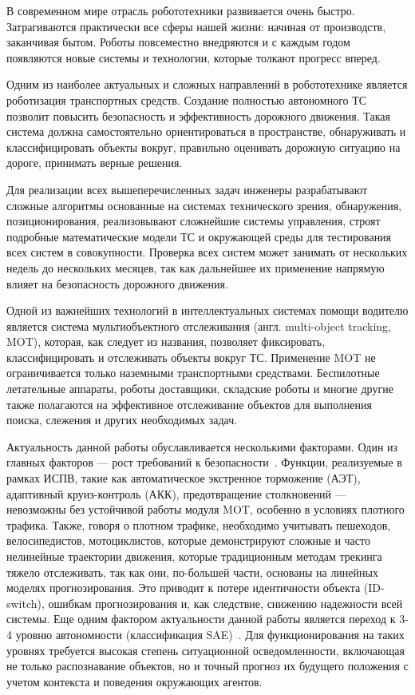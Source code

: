 
В современном мире отрасль робототехники развивается очень быстро. Затрагиваются практически все сферы нашей жизни: начиная от производств, заканчивая бытом. Роботы повсеместно внедряются и с каждым годом появляются новые системы и технологии, которые толкают прогресс вперед.
 
Одним из наиболее актуальных и сложных направлений в робототехнике является роботизация транспортных средств. Создание полностью автономного ТС позволит повысить безопасность и эффективность дорожного движения. Такая система должна самостоятельно ориентироваться в пространстве, обнаруживать и классифицировать объекты вокруг, правильно оценивать дорожную ситуацию на дороге, принимать верные решения.

Для реализации всех вышеперечисленных задач инженеры разрабатывают сложные алгоритмы основанные на системах технического зрения, обнаружения, позиционирования, реализовывают сложнейшие системы управления, строят подробные математические модели ТС и окружающей среды для тестирования всех систем в совокупности. Проверка всех систем может занимать от нескольких недель до нескольких месяцев, так как дальнейшее их применение напрямую влияет на безопасность дорожного движения.

Одной из важнейших технологий в интеллектуальных системах помощи водителю является система мультиобъектного отслеживания (англ. multi-object tracking, MOT), которая, как следует из названия, позволяет фиксировать, классифицировать и отслеживать объекты вокруг ТС. Применение MOT не ограничивается только наземными транспортными средствами. Беспилотные летательные аппараты, роботы доставщики, складские роботы и многие другие также полагаются на эффективное отслеживание объектов для выполнения поиска, слежения и других необходимых задач.

Актуальность данной работы обуславливается несколькими факторами. Один из главных факторов --- рост требований к безопасности~\cite{ShalevShwartz2017}. Функции, реализуемые в рамках ИСПВ, такие как автоматическое экстренное торможение (АЭТ), адаптивный круиз-контроль (АКК), предотвращение столкновений — невозможны без устойчивой работы модуля MOT, особенно в условиях плотного трафика. Также, говоря о плотном трафике, необходимо учитывать пешеходов, велосипедистов, мотоциклистов, которые демонстрируют сложные и часто нелинейные траектории движения, которые традиционным методам трекинга тяжело отслеживать, так как они, по-большей части, основаны на линейных моделях прогнозирования. Это приводит к потере идентичности объекта (ID-switch), ошибкам прогнозирования и, как следствие, снижению надежности всей системы.
Еще одним фактором актуальности данной работы является переход к 3-4 уровню автономности (классификация SAE)~\cite{Steckhan2022}. Для функционирования на таких уровнях требуется высокая степень ситуационной осведомленности, включающая не только распознавание объектов, но и точный прогноз их будущего положения с учетом контекста и поведения окружающих агентов.

